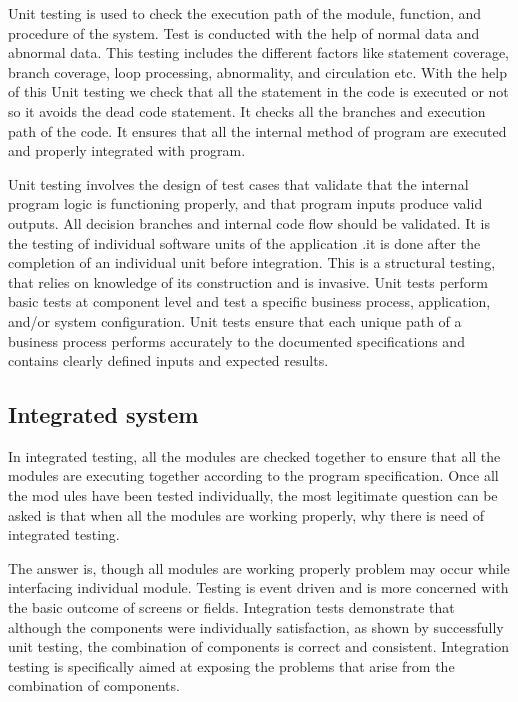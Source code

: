 \documentclass[12pt]{report}
\begin{document}
Unit testing is used to check the execution path of the module, function, and procedure of 
the system. Test is conducted with the help of normal data and abnormal data. This testing 
includes the different factors like statement coverage, branch coverage, loop processing, 
abnormality, and circulation etc. With the help of this Unit testing we check that all the 
statement in the code is executed or not so it avoids the dead code statement. It checks all 
the branches and execution path of the code. It ensures that all the internal method of 
program are executed and properly integrated with program.

Unit testing involves the design of test cases that validate that the internal program logic is 
functioning properly, and that program inputs produce valid outputs. All decision branches 
and internal code flow should be validated. It is the testing of individual software units of 
the application .it is done after the completion of an individual unit before integration. This 
is a structural testing, that relies on knowledge of its construction and is invasive. Unit tests 
perform basic tests at component level and test a specific business process, application, 
and/or system configuration. Unit tests ensure that each unique path of a business process 
performs accurately to the documented specifications and contains clearly defined inputs 
and expected results.

\subsection{Integrated system}
\justifying
\setlength{\parindent}{4em}
\setlength{\parskip}{0.5em}
\renewcommand{\baselinestretch}{1.5}
\normalsize

In integrated testing, all the modules are checked together to ensure that all the modules are 
executing together according to the program specification. Once all the mod ules have been 
tested individually, the most legitimate question can be asked is that when all the modules 
are working properly, why there is need of integrated testing.

The answer is, though all modules are working properly problem may occur while interfacing 
individual module. Testing is event driven and is more concerned with the 
basic outcome of screens or fields. Integration tests demonstrate that although the components 
were individually satisfaction, as shown by successfully unit testing, the combination of 
components is correct and consistent. Integration testing is specifically aimed at exposing the 
problems that arise from the combination of components.
\end{document}
